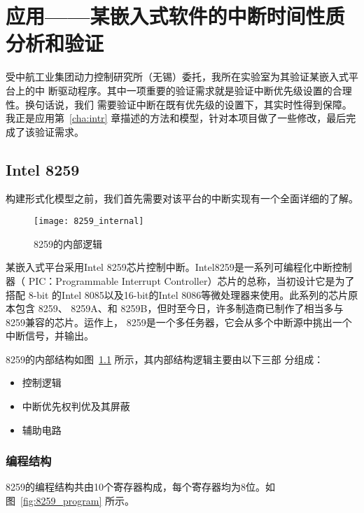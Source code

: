 
\chapter{应用——某嵌入式软件的中断时间性质分析和验证}
\label{cha:case}

受中航工业集团动力控制研究所（无锡）委托，我所在实验室为其验证某嵌入式平台上的中
断驱动程序。其中一项重要的验证需求就是验证中断优先级设置的合理性。换句话说，我们
需要验证中断在既有优先级的设置下，其实时性得到保障。我正是应用第~\ref{cha:intr} 
章描述的方法和模型，针对本项目做了一些修改，最后完成了该验证需求。

\section{Intel 8259}
\label{sec:8259}

构建形式化模型之前，我们首先需要对该平台的中断实现有一个全面详细的了解。

\begin{figure}[H]
	\centering
	\texttt{[image: 8259\_internal]}
	\caption{8259的内部逻辑}
	\label{fig:8259_internal}
\end{figure}

某嵌入式平台采用Intel 8259芯片控制中断。Intel8259是一系列可编程化中断控制器（
PIC：Programmable Interrupt Controller）芯片的总称，当初设计它是为了搭配 8-bit
的Intel 8085以及16-bit的Intel 8086等微处理器来使用。此系列的芯片原本包含 8259、
8259A、和 8259B，但时至今日，许多制造商已制作了相当多与8259兼容的芯片。运作上，
8259是一个多任务器，它会从多个中断源中挑出一个中断信号，并输出。

8259的内部结构如图~\ref{fig:8259_internal} 所示，其内部结构逻辑主要由以下三部
分组成：

\begin{itemize}
	\item 控制逻辑
	\item 中断优先权判优及其屏蔽
	\item 辅助电路
\end{itemize}

\subsection{编程结构}
\label{subsec:8259_program}

8259的编程结构共由10个寄存器构成，每个寄存器均为8位。如图~\ref{fig:8259_program}
所示。


